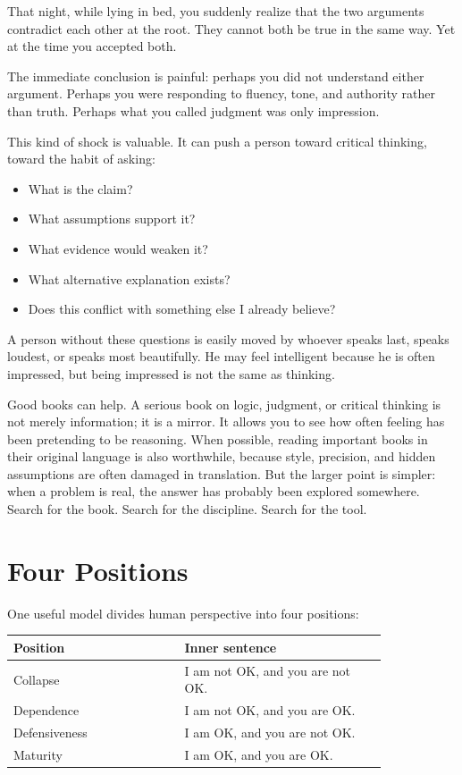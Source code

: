 That night, while lying in bed, you suddenly realize that the two arguments contradict each other at the root. They cannot both be true in the same way. Yet at the time you accepted both.

The immediate conclusion is painful: perhaps you did not understand either argument. Perhaps you were responding to fluency, tone, and authority rather than truth. Perhaps what you called judgment was only impression.

This kind of shock is valuable. It can push a person toward critical thinking, toward the habit of asking:

\begin{itemize}
\item What is the claim?
\item What assumptions support it?
\item What evidence would weaken it?
\item What alternative explanation exists?
\item Does this conflict with something else I already believe?
\end{itemize}

A person without these questions is easily moved by whoever speaks last, speaks loudest, or speaks most beautifully. He may feel intelligent because he is often impressed, but being impressed is not the same as thinking.

Good books can help. A serious book on logic, judgment, or critical thinking is not merely information; it is a mirror. It allows you to see how often feeling has been pretending to be reasoning. When possible, reading important books in their original language is also worthwhile, because style, precision, and hidden assumptions are often damaged in translation. But the larger point is simpler: when a problem is real, the answer has probably been explored somewhere. Search for the book. Search for the discipline. Search for the tool.

\section*{Four Positions}

One useful model divides human perspective into four positions:

\begin{center}
\begin{tabular}{p{0.38\linewidth}p{0.45\linewidth}}
\hline
Position & Inner sentence \\
\hline
Collapse & I am not OK, and you are not OK. \\
Dependence & I am not OK, and you are OK. \\
Defensiveness & I am OK, and you are not OK. \\
Maturity & I am OK, and you are OK. \\
\hline
\end{tabular}
\end{center}


